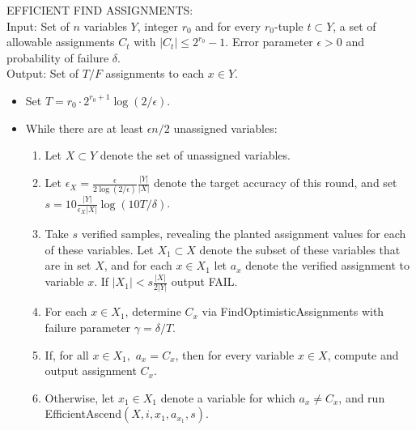 \documentclass[anon,12pt]{colt2018}
\newcommand{\eps}{\epsilon}
\begin{document}
\begin{algorithm}[H]
EFFICIENT FIND ASSIGNMENTS:\\
Input: Set of $n$ variables $Y$, integer $r_0$ and for every $r_0$-tuple $t \subset Y$, a set of allowable assignments $C_t$ with $|C_t| \le 2^{r_0}-1$.  Error parameter $\eps>0$ and probability of failure $\delta$. \\
Output: Set of $T/F$ assignments to each $x \in Y$.
\begin{itemize}
\item Set $T=  r_0\cdot 2^{r_0+1} \log (2/\eps)$.
\item While there are at least $\eps n/2$ unassigned variables:
\begin{enumerate}
\item Let $X \subset Y$ denote the set of unassigned variables.  
\item Let $\eps_X = \frac{\eps}{2\log(2/\eps)} \frac{|Y|}{|X|}$ denote the target accuracy of this round, and set $s = 10 \frac{|Y|}{\eps_X |X|} \log (10 T/\delta)$.
\item Take $s$ verified samples, revealing the planted assignment values for each of these variables.  Let $X_1\subset X$ denote the subset of these variables that are in set $X$, and for each $x \in X_1$ let $a_x$ denote the verified assignment to variable $x$.  If $|X_1| < s \frac{|X|}{2|Y|}$ output FAIL.
\item For each $x \in X_1$, determine $C_x$ via FindOptimisticAssignments with failure parameter $\gamma = \delta/T$.  
\item If, for all $x\in X_1,$ $a_x = C_x$, then for every variable $x \in X$, compute and output assignment $C_x$.
\item Otherwise, let $x_1 \in X_1$ denote a variable for which $a_x \neq C_x$, and run EfficientAscend$(X, i, x_1, a_{x_1}, s).$
\end{enumerate}
\end{itemize}
\end{algorithm}
\end{document}
